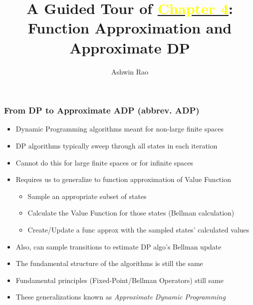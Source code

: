 \documentclass{beamer}
\title[Approximate DP Chapter]{A Guided Tour of \href{http://stanford.edu/~ashlearn/RLForFinanceBook/book.pdf}{\underline{\textcolor{yellow}{Chapter 4}}}: \\ Function Approximation and Approximate DP} %
\author{Ashwin Rao} %
\institute[Stanford] %
{ICME, Stanford University
}
\date %
\begin{document}
\lstset{language=Python}  
\begin{frame}
\titlepage %
\end{frame}


\begin{frame}
\frametitle{From DP to Approximate ADP (abbrev. ADP)}
\begin{itemize}[<+->]
\item Dynamic Programming algorithms meant for non-large finite spaces
\item DP algorithms typically sweep through all states in each iteration
\item Cannot do this for large finite spaces or for infinite spaces
\item Requires us to generalize to function approximation of Value Function
\begin{itemize}[<+->]
\item Sample an appropriate subset of states 
\item Calculate the Value Function for those states (Bellman calculation)
\item Create/Update a func approx with the sampled states' calculated values
\end{itemize}
\item Also, can sample transitions to estimate DP algo's Bellman update
\item The fundamental structure of the algorithms is still the same
\item Fundamental principles (Fixed-Point/Bellman Operators) still same
\item These generalizations known as {\em Approximate Dynamic Programming}
 \end{itemize}
\end{frame}
\end{document}
